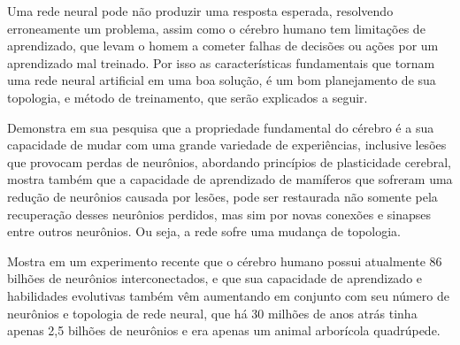 \documentclass[	12pt, Times, openright, twoside, a4paper, english, brazil]{abntex2}
\begin{document}
            Uma rede neural pode não produzir uma resposta esperada, resolvendo erroneamente um problema, assim como o cérebro humano tem limitações de aprendizado, que levam o homem a cometer falhas de decisões ou ações por um aprendizado mal treinado. Por isso as características fundamentais que tornam uma rede neural artificial em uma boa solução, é um bom planejamento de sua topologia, e método de treinamento, que serão explicados a seguir.

            \cite{Muhammad2014} Demonstra em sua pesquisa que a propriedade fundamental do cérebro é a sua capacidade de mudar com uma grande variedade de experiências, inclusive lesões que provocam perdas de neurônios, abordando princípios de plasticidade cerebral, mostra também que a capacidade de aprendizado de mamíferos que sofreram uma redução de neurônios causada por lesões, pode ser restaurada não somente pela recuperação desses neurônios perdidos, mas sim por novas conexões e sinapses entre outros neurônios. Ou seja, a rede sofre uma mudança de topologia.

            \cite{Fapesp192} Mostra em um experimento recente que o cérebro humano possui atualmente 86 bilhões de neurônios interconectados, e que sua capacidade de aprendizado e habilidades evolutivas também vêm aumentando em conjunto com seu número de neurônios e topologia de rede neural, que há 30 milhões de anos atrás tinha apenas 2,5 bilhões de neurônios e era apenas um animal arborícola quadrúpede.
\end{document}
